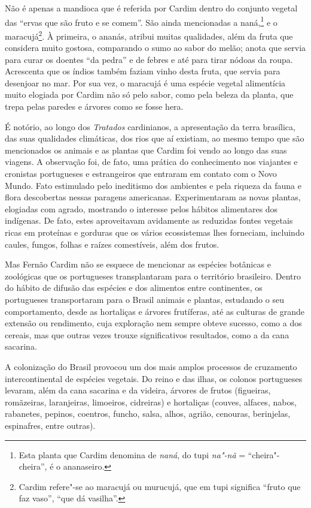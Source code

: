  Não é apenas a mandioca que é referida por Cardim dentro do
conjunto vegetal das ``ervas que são fruto e se comem''. São
ainda mencionadas a naná,\footnote{ Esta planta que Cardim
denomina de \textit{naná}, do tupi \textit{na"-nã} = ``cheira"-cheira'', é
o ananaseiro.} e o maracujá\footnote{ Cardim
refere"-se ao maracujá ou murucujá, que em tupi
significa ``fruto que faz vaso'', ``que dá vasilha''.}. À
primeira, o ananás, atribui muitas qualidades, além da fruta que
considera muito gostosa, comparando o sumo ao sabor do melão; anota que
servia para curar os doentes ``da pedra'' e de febres e até para tirar
nódoas da roupa. Acrescenta que os índios também faziam vinho desta
fruta, que servia para desenjoar no mar. Por sua vez, o maracujá é uma
espécie vegetal alimentícia muito elogiada por Cardim não só pelo
sabor, como pela beleza da planta, que trepa pelas paredes e árvores como se fosse hera. 

 É notório, ao longo dos \textit{Tratados} cardinianos, a
apresentação da terra brasílica, das suas qualidades climáticas, dos
rios que aí existiam, ao mesmo tempo que são mencionados os animais e
as plantas que Cardim foi vendo ao longo das suas viagens. A observação
foi, de fato, uma prática do conhecimento nos viajantes e cronistas
portugueses e estrangeiros que entraram em contato com o Novo
Mundo. Fato estimulado pelo ineditismo dos ambientes e pela riqueza
da fauna e flora descobertas nessas paragens americanas. Experimentaram
as novas plantas, elogiadas com agrado, mostrando o interesse pelos
hábitos alimentares dos indígenas. De fato, estes aproveitavam
avidamente as reduzidas fontes vegetais ricas em proteínas e gorduras
que os vários ecossistemas lhes forneciam, incluindo caules, fungos,
folhas e raízes comestíveis, além dos frutos.

Mas Fernão Cardim não se esquece de mencionar as espécies botânicas
e zoológicas que os portugueses transplantaram para o território
brasileiro. Dentro do hábito de difusão das espécies e dos alimentos
entre continentes, os portugueses transportaram para o Brasil animais e
plantas, estudando o seu comportamento, desde as hortaliças e árvores
frutíferas, até as culturas de grande extensão ou rendimento, cuja
exploração nem sempre obteve sucesso, como a dos cereais, mas que
outras vezes trouxe significativos resultados, como a da cana sacarina.

A colonização do Brasil provocou um dos mais amplos processos de
cruzamento intercontinental de espécies vegetais. Do reino e das ilhas,
os colonos portugueses levaram, além da cana sacarina e da videira,
árvores de frutos (figueiras, romãzeiras, laranjeiras, limoeiros,
cidreiras) e hortaliças (couves, alfaces, nabos, rabanetes, pepinos,
coentros, funcho, salsa, alhos, agrião, cenouras, berinjelas,
espinafres, entre outras). 

